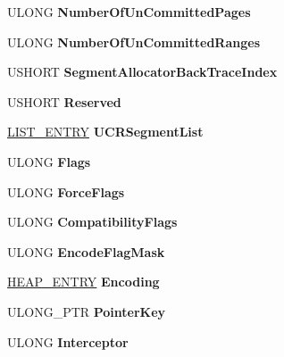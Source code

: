 \begin{DoxyCompactItemize}
U\+L\+O\+NG {\bfseries Number\+Of\+Un\+Committed\+Pages}
\item 
\mbox{\label{struct___h_e_a_p_a51e427dff16f5719f90e91bd352a8122}} 
U\+L\+O\+NG {\bfseries Number\+Of\+Un\+Committed\+Ranges}
\item 
\mbox{\label{struct___h_e_a_p_a27c10f5fa3fbb8059a6da21d251c58ac}} 
U\+S\+H\+O\+RT {\bfseries Segment\+Allocator\+Back\+Trace\+Index}
\item 
\mbox{\label{struct___h_e_a_p_ac71f4201280171ce8141fcf335ebf9a1}} 
U\+S\+H\+O\+RT {\bfseries Reserved}
\item 
\mbox{\label{struct___h_e_a_p_a2a46d483ecc1a34b03efdb2ae2276115}} 
\hyperlink{struct___l_i_s_t___e_n_t_r_y}{L\+I\+S\+T\+\_\+\+E\+N\+T\+RY} {\bfseries U\+C\+R\+Segment\+List}
\item 
\mbox{\label{struct___h_e_a_p_a0aa04b3f903c0c9fac9a7df2bfc3c127}} 
U\+L\+O\+NG {\bfseries Flags}
\item 
\mbox{\label{struct___h_e_a_p_a6c1dd8477bfe49dc7bf4dd876d79b938}} 
U\+L\+O\+NG {\bfseries Force\+Flags}
\item 
\mbox{\label{struct___h_e_a_p_af10223d2c0668661c41a96424103a964}} 
U\+L\+O\+NG {\bfseries Compatibility\+Flags}
\item 
\mbox{\label{struct___h_e_a_p_a6131296d1a8b40e5685cd26cb5ccf161}} 
U\+L\+O\+NG {\bfseries Encode\+Flag\+Mask}
\item 
\mbox{\label{struct___h_e_a_p_aea1cc8f128db12af08b793eb73ded554}} 
\hyperlink{struct___h_e_a_p___e_n_t_r_y}{H\+E\+A\+P\+\_\+\+E\+N\+T\+RY} {\bfseries Encoding}
\item 
\mbox{\label{struct___h_e_a_p_a187886613c992f0702a6dfd329fc6416}} 
U\+L\+O\+N\+G\+\_\+\+P\+TR {\bfseries Pointer\+Key}
\item 
\mbox{\label{struct___h_e_a_p_a1c53eeabcdcdda7beb0404172d6ce0bb}} 
U\+L\+O\+NG {\bfseries Interceptor}

\end{DoxyCompactItemize}
